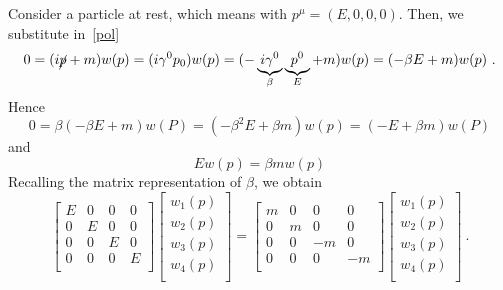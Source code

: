     \begin{example}
        Consider a particle at rest, which means with $p^\mu = (E,0,0,0)$. Then, we substitute in~\eqref{pol}
        \begin{equation*}
            0  = (i \cancel p + m)w(p) = (i \gamma^0 p_0) w(p) = (- \underbrace{i \gamma^0}_{\beta} \underbrace{p^0}_E + m) w(p) = (- \beta E + m) w(p) ~.
        \end{equation*}
        Hence 
        \begin{equation*}
            0 = \beta (- \beta E + m) w(P) = (- \beta^2 E + \beta m) w(p) = (- E + \beta m) w(P)
        \end{equation*}
        and 
        \begin{equation*}
            E w(p) = \beta m w(p)
        \end{equation*}
        Recalling the matrix representation of $\beta$, we obtain 
        \begin{equation*}
            \begin{bmatrix}
                E & 0 & 0 & 0 \\
                0 & E & 0 & 0 \\
                0 & 0 & E & 0 \\
                0 & 0 & 0 & E \\
            \end{bmatrix} 
            \begin{bmatrix}
                w_1(p) \\ w_2(p) \\ w_3(p) \\ w_4(p) \\
            \end{bmatrix} = 
            \begin{bmatrix}
                m & 0 & 0 & 0 \\
                0 & m & 0 & 0 \\
                0 & 0 & -m & 0 \\
                0 & 0 & 0 & -m \\
            \end{bmatrix}
            \begin{bmatrix}
                w_1(p) \\ w_2(p) \\ w_3(p) \\ w_4(p) \\ 
            \end{bmatrix} ~.
        \end{equation*}

\end{example}
